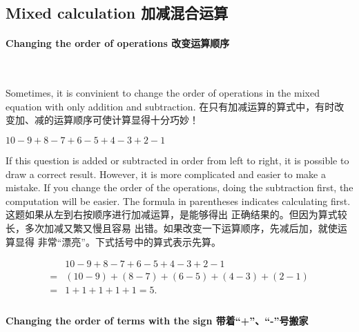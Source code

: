 \subsection{Mixed calculation 加减混合运算}

\paragraph{Changing the order of operations  改变运算顺序}
\ \  

\begin{paracol}{2}
Sometimes, it is convinient to change the order of operations in the mixed equation with only addition and subtraction.
\switchcolumn[1]
在只有加减运算的算式中，有时改变加、减的运算顺序可使计算显得十分巧妙！
\end{paracol}

\begin{example}
$10-9+8-7+6-5+4-3+2-1$
\end{example}
\begin{solution}
\begin{paracol}{2}
If this question is added or subtracted in order from left to right, it is possible to draw a correct result. However,  it is more complicated  and easier to make a mistake. If you change the order of the operations, doing the subtraction first, the computation will be easier. The formula in parentheses indicates  calculating first.
\switchcolumn[1]
这题如果从左到右按顺序进行加减运算，是能够得出
正确结果的。但因为算式较长，多次加减又繁又慢且容易
出错。如果改变一下运算顺序，先减后加，就使运算显得
非常“漂亮”。下式括号中的算式表示先算。
\end{paracol}
$$
\begin{aligned}
&10-9+8-7+6-5+4-3+2-1\\
=&(10-9)+(8-7)+(6-5)+(4-3)+(2-1)\\
=&1+1+1+1+1 = 5.\\
\end{aligned}
$$

\end{solution}

\paragraph{Changing the order of terms with the sign  带着“+”、“-”号搬家}
\ \  

